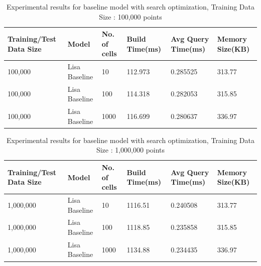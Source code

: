 \begin{table}[ht]
	\centering
	\begin{tabular}{||p{}<{\centering}|p{}<{\centering}| p{}<{\centering}|p{}<{\centering}|p{}<{\centering}|p{}<{\centering}||}
		\hline
		Training/Test Data Size& Model & No. of cells & Build Time(ms) & Avg Query Time(ms) & Memory Size(KB)\\ [0.5ex] 
		\hline
		\hline
		100,000& Lisa Baseline & 10 & 112.973 & 0.285525 & 313.77\\
		\hline
		100,000& Lisa Baseline & 100 & 114.318 & 0.282053 & 315.85\\
		\hline
		100,000& Lisa Baseline & 1000 & 116.699 & 0.280637 & 336.97\\
		\hline
		\hline
	\end{tabular}
	\caption{Experimental results for baseline model with search optimization, Training Data Size : 100,000 points}
	\label{baseline_search_optimization_100000}

\end{table}

\begin{table}[ht]
	\centering
	\begin{tabular}{||p{}<{\centering}|p{}<{\centering}| p{}<{\centering}|p{}<{\centering}|p{}<{\centering}|p{}<{\centering}||}
		\hline
		Training/Test Data Size& Model & No. of cells & Build Time(ms) & Avg Query Time(ms) & Memory Size(KB)\\ [0.5ex] 
		\hline
		\hline
		1,000,000& Lisa Baseline & 10 & 1116.51 & 0.240508 & 313.77\\
		\hline
		1,000,000& Lisa Baseline & 100 & 1118.85 &0.235858 & 315.85\\
		\hline
		1,000,000& Lisa Baseline & 1000 & 1134.88 & 0.234435 & 336.97\\
		\hline
		\hline
	\end{tabular}
	\caption{Experimental results for baseline model with search optimization, Training Data Size : 1,000,000 points}
	\label{baseline_search_optimization_1000000}

\end{table}

